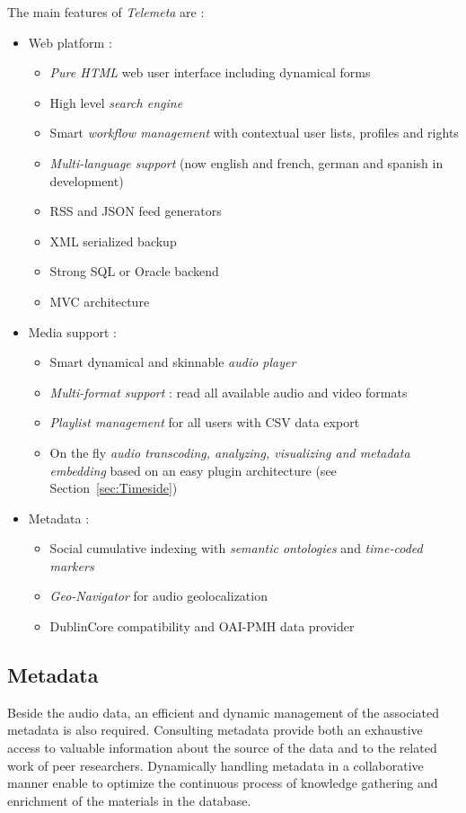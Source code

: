 \documentclass[runningheads,a4paper]{llncs}
\begin{document}
The main features of \emph{Telemeta} are :
\begin{itemize}
\item Web platform :
  \begin{itemize}
  \item \emph{Pure HTML} web user interface including dynamical forms
  \item High level \emph{search engine}
  \item Smart \emph{workflow management} with contextual user lists, profiles and rights
  \item \emph{Multi-language support} (now english and french, german and
    spanish in development)
  \item RSS and JSON feed generators
  \item XML serialized backup
  \item Strong SQL or Oracle backend
  \item MVC architecture 
  \end{itemize}
\item Media support :
  \begin{itemize}
  \item Smart dynamical and skinnable \emph{audio player}
  \item \emph{Multi-format support} : read all available audio and video formats  
  \item \emph{Playlist management} for all users with CSV data export
  \item On the fly \emph{audio transcoding, analyzing, visualizing and metadata embedding} based on an easy plugin architecture (see Section~\ref{sec:Timeside})
  \end{itemize}
\item Metadata :   
  \begin{itemize}
  \item Social cumulative indexing with \emph{semantic ontologies} and
    \emph{time-coded markers}
  \item \emph{Geo-Navigator} for audio geolocalization
  \item DublinCore compatibility ​and OAI-PMH data provider
  \end{itemize}
\end{itemize}


\subsection{Metadata}\label{sec:metadata}
Beside the audio data, an efficient and dynamic management of the associated metadata is also required. Consulting metadata provide both an exhaustive access to valuable information about the source of the data and to the related work of peer researchers. 
Dynamically handling metadata in a collaborative manner enable to optimize the continuous process of knowledge gathering and enrichment of the materials in the database.  
\end{document}

